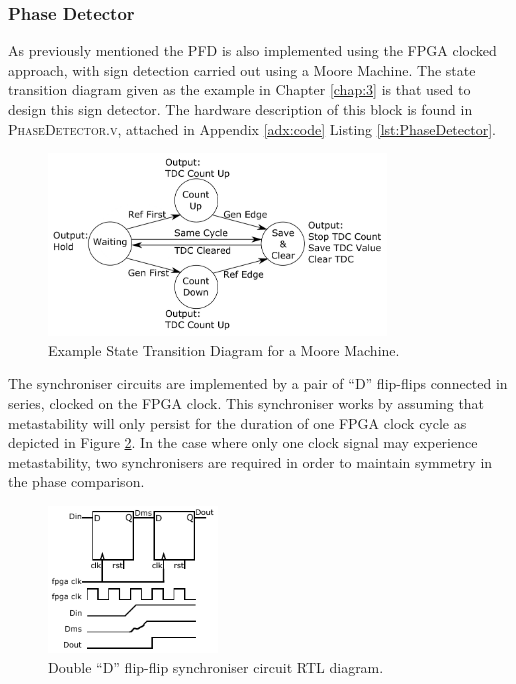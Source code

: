 \subsubsection{Phase Detector}
As previously mentioned the \ac{PFD} is also implemented using the \ac{FPGA} clocked approach, with sign detection carried out using a Moore Machine. The state transition diagram given as the example in Chapter \ref{chap:3} is that used to design this sign detector. The hardware description of this block is found in \textsc{PhaseDetector.v}, attached in Appendix \ref{adx:code} Listing \ref{lst:PhaseDetector}.
\begin{figure}[h]
    \centering
    \includegraphics[width=0.8\textwidth]{../state_trans_new}
    \caption[Example State Transition Diagram for a Moore Machine]{Example State Transition Diagram for a Moore Machine.}
    \label{fig:state_trans_reprint}
\end{figure}

The synchroniser circuits are implemented by a pair of ``D'' flip-flips connected in series, clocked on the \ac{FPGA} clock. This synchroniser works by assuming that metastability will only persist for the duration of one \ac{FPGA} clock cycle as depicted in Figure \ref{fig:synchroniser_behav}. In the case where only one clock signal may experience metastability, two synchronisers are required in order to maintain symmetry in the phase comparison.
\begin{figure}[h]
\centering
\includegraphics[width=0.4\textwidth]{../synchroniser_behav}
\caption[Double ``D'' flip-flip synchroniser circuit \ac{RTL} diagram]{Double ``D'' flip-flip synchroniser circuit \ac{RTL} diagram.}
\label{fig:synchroniser_behav}
\end{figure}

